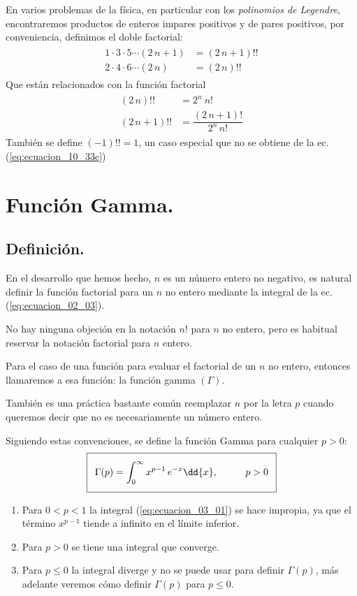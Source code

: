 En varios problemas de la física, en particular con los \emph{polinomios de Legendre}, encontraremos productos de enteros impares positivos y de pares positivos, por conveniencia, definimos el doble factorial:
\begin{align}
\begin{aligned}
1 \cdot 3 \cdot 5 \cdots (2 \, n+1) &= (2 \, n+1) !! \\
2 \cdot 4 \cdot 6 \cdots (2 \, n) &= (2 \, n) !!
\end{aligned}
\label{eq:ecuacion_10_33b}
\end{align}
Que están relacionados con la función factorial
\begin{align}
\begin{aligned}
(2 \, n)!! &=  2^{n} \: n! \\[1em]
(2 \, n+1)!! &= \dfrac{(2 \, n+1)!}{2^{n} \, n!}
\end{aligned}
\label{eq:ecuacion_10_33c}
\end{align}
También se define $(-1)!! = 1$, un caso especial que no se obtiene de la ec. (\ref{eq:ecuacion_10_33c})

\section{Función Gamma.}

\subsection{Definición.}

En el desarrollo que hemos hecho, $n$ es un número entero no negativo, es natural definir la función factorial para un $n$ no entero mediante la integral de la ec.(\ref{eq:ecuacion_02_03}).
\par
No hay ninguna objeción en la notación $n!$ para $n$ no entero, pero es habitual reservar la notación factorial para $n$ entero.
\par
Para el caso de una función para evaluar el factorial de un $n$ no entero, entonces llamaremos a esa función: la función gamma $(\Gamma)$.
\par
También es una práctica bastante común reemplazar $n$ por la letra $p$ cuando queremos decir que no es necesariamente un número entero.
\par
Siguiendo estas convenciones, se define la función Gamma para cualquier $p > 0$:
\begin{align}\addtolength{\fboxsep}{5pt}\boxed{
\Gamma (p) = \int_{0}^{\infty} x^{p-1} \, e^{-x} \dd{x}, \hspace{1cm} p > 0}
\label{eq:ecuacion_03_01}
\end{align}
\begin{enumerate}
\item Para $0 < p < 1$ la integral (\ref{eq:ecuacion_03_01}) se hace impropia, ya que el término $x^{p-1}$ tiende a infinito en el límite inferior.
\item Para $p > 0$ se tiene una integral que converge.
\item Para $p \leq 0$ la integral diverge y no se puede usar para definir $\Gamma (p)$, más adelante veremos cómo definir  $\Gamma (p)$ para $p \leq 0$.
\end{enumerate}


